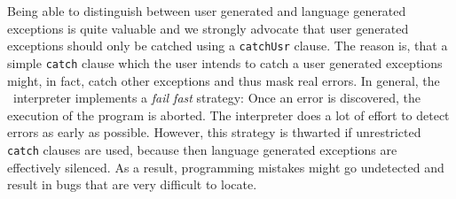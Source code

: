 Being able to distinguish between user generated  and language generated exceptions is
quite valuable and we strongly advocate that user generated exceptions should only be
catched using a \texttt{catchUsr} clause.  The reason is, that a simple
\texttt{catch} clause which the user intends to catch a user generated exceptions might,
in fact, catch 
other exceptions and thus mask real errors.  In general, the \setlx\ interpreter
implements a \emph{fail fast} strategy:  Once an error is discovered, the execution of the
program is aborted.  The interpreter does a lot of effort to detect errors as early as
possible.  However, this strategy  is thwarted if unrestricted \texttt{catch} clauses are used,
because then language generated exceptions are effectively silenced.  As a result, programming
mistakes might go undetected and result in bugs that are very difficult to locate.

